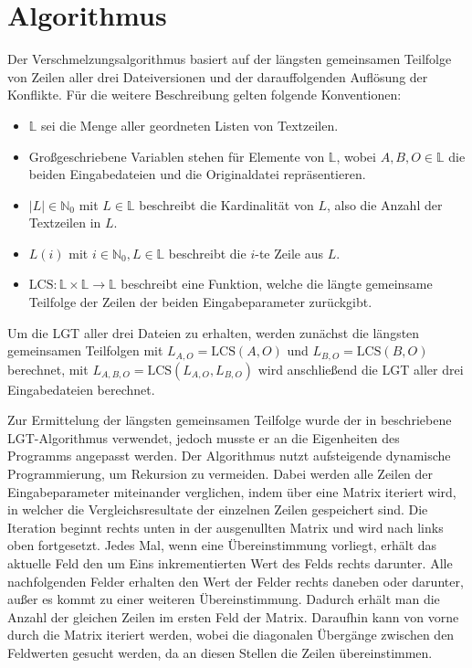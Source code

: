 \documentclass[a4paper,titlepage,12pt]{scrartcl}
\begin{document}
\section{Algorithmus}
\label{sec:algorithm}
Der Verschmelzungsalgorithmus basiert auf der längsten gemeinsamen Teilfolge von Zeilen aller drei Dateiversionen und der darauffolgenden Auflösung der Konflikte.
Für die weitere Beschreibung gelten folgende Konventionen:
\begin{itemize}
\item $\mathbb{L}$ sei die Menge aller geordneten Listen von Textzeilen.
\item Großgeschriebene Variablen stehen für Elemente von $\mathbb{L}$,
wobei $A, B, O \in \mathbb{L}$ die beiden Eingabedateien und die Originaldatei repräsentieren.
\item $|L| \in \mathbb{N}_0$ mit $L \in \mathbb{L}$ beschreibt die Kardinalität von $L$,
also die Anzahl der Textzeilen in $L$.
\item $L(i)$ mit $i \in \mathbb{N}_0, L \in \mathbb{L}$ beschreibt die $i$-te Zeile aus $L$.
\item $\mbox{LCS}: \mathbb{L} \times \mathbb{L} \rightarrow \mathbb{L}$ beschreibt eine Funktion,
welche die längte gemeinsame Teilfolge der Zeilen der beiden Eingabeparameter zurückgibt.
\end{itemize}

Um die LGT aller drei Dateien zu erhalten,
werden zunächst die längsten gemeinsamen Teilfolgen mit $L_{A,O} = \mbox{LCS}(A, O)$ und $L_{B,O} = \mbox{LCS}(B, O)$ berechnet,
mit $L_{A,B,O} = \mbox{LCS}(L_{A,O}, L_{B,O})$ wird anschließend die LGT aller drei Eingabedateien berechnet.

Zur Ermittelung der längsten gemeinsamen Teilfolge wurde der in \citet{web:eppstein} beschriebene LGT-Algorithmus verwendet,
jedoch musste er an die Eigenheiten des Programms angepasst werden.
Der Algorithmus nutzt aufsteigende dynamische Programmierung,
um Rekursion zu vermeiden.
Dabei werden alle Zeilen der Eingabeparameter miteinander verglichen,
indem über eine Matrix iteriert wird,
in welcher die Vergleichsresultate der einzelnen Zeilen gespeichert sind.
Die Iteration beginnt rechts unten in der ausgenullten Matrix und wird nach links oben fortgesetzt.
Jedes Mal, wenn eine Übereinstimmung vorliegt,
erhält das aktuelle Feld den um Eins inkrementierten Wert des Felds rechts darunter.
Alle nachfolgenden Felder erhalten den Wert der Felder rechts daneben oder darunter,
außer es kommt zu einer weiteren Übereinstimmung.
Dadurch erhält man die Anzahl der gleichen Zeilen im ersten Feld der Matrix.
Daraufhin kann von vorne durch die Matrix iteriert werden,
wobei die diagonalen Übergänge zwischen den Feldwerten gesucht werden,
da an diesen Stellen die Zeilen übereinstimmen.
\end{document}
